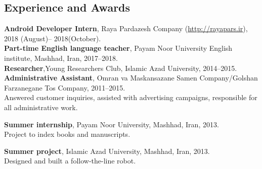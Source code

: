 \documentclass[10pt]{article}
\begin{document}
\subsection*{Experience and Awards}
\textbf {Android Developer Intern}, Raya Pardazesh Company (\url{http://rayapars.ir}), 2018 (August)-- 2018(October). \vspace{0.5mm}\\
\textbf {Part-time English language teacher}, Payam Noor University English institute, Mashhad, Iran, 2017--2018. \vspace{0.5mm}\\
\noindent\textbf {Researcher},Young Researchers Club, Islamic Azad University, 2014--2015. \vspace{0.5mm}\\
\noindent\textbf{Administrative Assistant}, Omran va Maskansazane Samen Company/Golshan Farzanegane Tos Company, 2011--2015. \\
\indent Answered customer inquiries, assisted with advertising campaigns, responsible for all administrative work. \vspace{0.5mm}

\noindent\textbf{Summer internship}, Payam Noor University, Mashhad, Iran, 2013.\\
\indent Project to index books and manuscripts. \vspace{0.5mm}

\noindent\textbf{Summer project}, Islamic Azad University, Mashhad, Iran, 2013.\\
\indent Designed and built a follow-the-line robot. \vspace{0.5mm}
\end{document}
